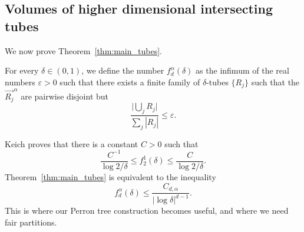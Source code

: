 \documentclass[10pt]{amsart}
\newcommand\translate[2]{\overrightarrow{#1}^{#2}}
\begin{document}
\subsection{Volumes of higher dimensional intersecting tubes}\label{subsection:tubes}
We now prove Theorem~\ref{thm:main_tubes}. 

For every $\delta\in (0,1)$, we define the number $f_d^\alpha(\delta)$ as the infimum of the real numbers $\varepsilon>0$ such that there exists a finite family of $\delta$-tubes $\{R_j\}$ such that the $\translate{R_j}{\alpha}$ are pairwise disjoint but
    \begin{equation}\label{eq: f delta}
        \frac{\big|\bigcup_j R_j\big|}{\sum_j|R_j|}\leq \varepsilon.
    \end{equation}
    
Keich \cite{RefWorks:keich1999lp} proves that there is a constant $C>0$ such that 
\begin{equation*}
    \frac{C^{-1}}{\log 2/\delta}\leq f_2^1(\delta)\leq \frac{C}{\log 2/\delta}.
\end{equation*}
 Theorem~\ref{thm:main_tubes} is equivalent to the inequality 
 \begin{equation}\label{eq:main_tubes} f_d^\alpha(\delta) \leq \frac{C_{d,\alpha}}{|\log \delta|^{d-1}}.\end{equation}
 This is where our Perron tree construction becomes useful, and where we need fair partitions.
\end{document}
